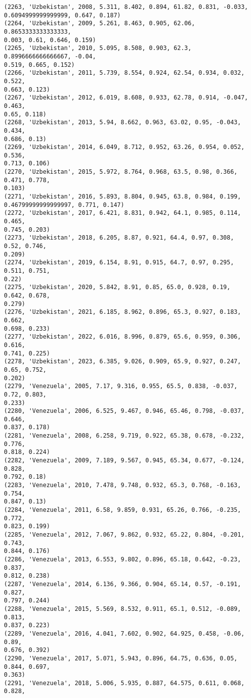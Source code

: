 \documentclass[11pt]{article}
\begin{document}
\begin{Verbatim}[commandchars=\\\{\}]
(2263, 'Uzbekistan', 2008, 5.311, 8.402, 0.894, 61.82, 0.831, -0.033,
0.6094999999999999, 0.647, 0.187)
(2264, 'Uzbekistan', 2009, 5.261, 8.463, 0.905, 62.06, 0.8653333333333333,
0.003, 0.61, 0.646, 0.159)
(2265, 'Uzbekistan', 2010, 5.095, 8.508, 0.903, 62.3, 0.8996666666666667, -0.04,
0.519, 0.665, 0.152)
(2266, 'Uzbekistan', 2011, 5.739, 8.554, 0.924, 62.54, 0.934, 0.032, 0.522,
0.663, 0.123)
(2267, 'Uzbekistan', 2012, 6.019, 8.608, 0.933, 62.78, 0.914, -0.047, 0.463,
0.65, 0.118)
(2268, 'Uzbekistan', 2013, 5.94, 8.662, 0.963, 63.02, 0.95, -0.043, 0.434,
0.686, 0.13)
(2269, 'Uzbekistan', 2014, 6.049, 8.712, 0.952, 63.26, 0.954, 0.052, 0.536,
0.713, 0.106)
(2270, 'Uzbekistan', 2015, 5.972, 8.764, 0.968, 63.5, 0.98, 0.366, 0.471, 0.778,
0.103)
(2271, 'Uzbekistan', 2016, 5.893, 8.804, 0.945, 63.8, 0.984, 0.199,
0.46799999999999997, 0.771, 0.147)
(2272, 'Uzbekistan', 2017, 6.421, 8.831, 0.942, 64.1, 0.985, 0.114, 0.465,
0.745, 0.203)
(2273, 'Uzbekistan', 2018, 6.205, 8.87, 0.921, 64.4, 0.97, 0.308, 0.52, 0.746,
0.209)
(2274, 'Uzbekistan', 2019, 6.154, 8.91, 0.915, 64.7, 0.97, 0.295, 0.511, 0.751,
0.22)
(2275, 'Uzbekistan', 2020, 5.842, 8.91, 0.85, 65.0, 0.928, 0.19, 0.642, 0.678,
0.279)
(2276, 'Uzbekistan', 2021, 6.185, 8.962, 0.896, 65.3, 0.927, 0.183, 0.662,
0.698, 0.233)
(2277, 'Uzbekistan', 2022, 6.016, 8.996, 0.879, 65.6, 0.959, 0.306, 0.616,
0.741, 0.225)
(2278, 'Uzbekistan', 2023, 6.385, 9.026, 0.909, 65.9, 0.927, 0.247, 0.65, 0.752,
0.202)
(2279, 'Venezuela', 2005, 7.17, 9.316, 0.955, 65.5, 0.838, -0.037, 0.72, 0.803,
0.233)
(2280, 'Venezuela', 2006, 6.525, 9.467, 0.946, 65.46, 0.798, -0.037, 0.646,
0.837, 0.178)
(2281, 'Venezuela', 2008, 6.258, 9.719, 0.922, 65.38, 0.678, -0.232, 0.776,
0.818, 0.224)
(2282, 'Venezuela', 2009, 7.189, 9.567, 0.945, 65.34, 0.677, -0.124, 0.828,
0.792, 0.18)
(2283, 'Venezuela', 2010, 7.478, 9.748, 0.932, 65.3, 0.768, -0.163, 0.754,
0.847, 0.13)
(2284, 'Venezuela', 2011, 6.58, 9.859, 0.931, 65.26, 0.766, -0.235, 0.772,
0.823, 0.199)
(2285, 'Venezuela', 2012, 7.067, 9.862, 0.932, 65.22, 0.804, -0.201, 0.743,
0.844, 0.176)
(2286, 'Venezuela', 2013, 6.553, 9.802, 0.896, 65.18, 0.642, -0.23, 0.837,
0.812, 0.238)
(2287, 'Venezuela', 2014, 6.136, 9.366, 0.904, 65.14, 0.57, -0.191, 0.827,
0.797, 0.244)
(2288, 'Venezuela', 2015, 5.569, 8.532, 0.911, 65.1, 0.512, -0.089, 0.813,
0.837, 0.223)
(2289, 'Venezuela', 2016, 4.041, 7.602, 0.902, 64.925, 0.458, -0.06, 0.89,
0.676, 0.392)
(2290, 'Venezuela', 2017, 5.071, 5.943, 0.896, 64.75, 0.636, 0.05, 0.844, 0.697,
0.363)
(2291, 'Venezuela', 2018, 5.006, 5.935, 0.887, 64.575, 0.611, 0.068, 0.828,

\end{Verbatim}
\end{document}
